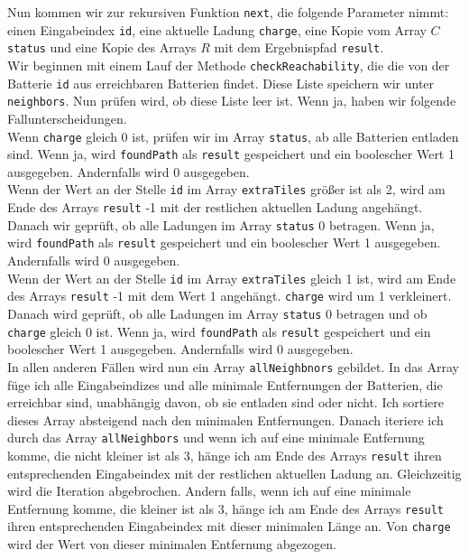 \documentclass[a4paper,10pt,ngerman]{scrartcl}
\begin{document}
Nun kommen wir zur rekursiven Funktion \texttt{next}, die folgende Parameter nimmt: 
einen Eingabeindex \texttt{id}, eine aktuelle Ladung \texttt{charge}, eine Kopie vom Array $C$ \texttt{status} und eine Kopie des
Arrays $R$ mit dem Ergebnispfad \texttt{result}.\\
Wir beginnen mit einem Lauf der Methode \texttt{checkReachability}, die die von der Batterie \texttt{id} aus erreichbaren Batterien
findet. Diese Liste speichern wir unter \texttt{neighbors}. Nun prüfen wird, ob diese Liste leer ist.
Wenn ja, haben wir folgende Fallunterscheidungen.\\
Wenn \texttt{charge} gleich 0 ist, prüfen wir im Array \texttt{status}, ab alle Batterien entladen sind.
Wenn ja, wird \texttt{foundPath} als \texttt{result} gespeichert und ein boolescher Wert 1 ausgegeben. Andernfalls wird 0 ausgegeben.\\
Wenn der Wert an der Stelle \texttt{id} im Array \texttt{extraTiles} größer ist als 2, wird am Ende des Arrays \texttt{result}
-1 mit der restlichen aktuellen Ladung angehängt. Danach wir geprüft, ob alle Ladungen im Array \texttt{status} 0 betragen.
Wenn ja, wird \texttt{foundPath} als \texttt{result} gespeichert und ein boolescher Wert 1 ausgegeben. Andernfalls wird 0 ausgegeben.\\
Wenn der Wert an der Stelle \texttt{id} im Array \texttt{extraTiles} gleich 1 ist, wird am Ende des Arrays \texttt{result}
-1 mit dem Wert 1 angehängt. \texttt{charge} wird um 1 verkleinert. Danach wird geprüft, ob alle Ladungen im Array \texttt{status} 0 betragen
und ob \texttt{charge} gleich 0 ist.
Wenn ja, wird \texttt{foundPath} als \texttt{result} gespeichert und ein boolescher Wert 1 ausgegeben. Andernfalls wird 0 ausgegeben.\\
In allen anderen Fällen wird nun ein Array \texttt{allNeighbnors} gebildet. In das Array füge ich alle Eingabeindizes und alle
minimale Entfernungen der Batterien, die erreichbar sind, unabhängig davon, ob sie entladen sind oder nicht.
Ich sortiere dieses Array absteigend nach den minimalen Entfernungen.
Danach iteriere ich durch das Array \texttt{allNeighbors} und wenn ich auf eine minimale Entfernung komme, die
nicht kleiner ist als 3, hänge ich am Ende des Arrays \texttt{result} ihren entsprechenden Eingabeindex mit der restlichen aktuellen Ladung an.
Gleichzeitig wird die Iteration abgebrochen.
Andern falls, wenn ich auf eine minimale Entfernung komme, die kleiner ist als 3, hänge ich am Ende des Arrays \texttt{result} ihren entsprechenden Eingabeindex mit dieser minimalen Länge an. Von \texttt{charge} wird der Wert von dieser minimalen Entfernung abgezogen.
\end{document}
